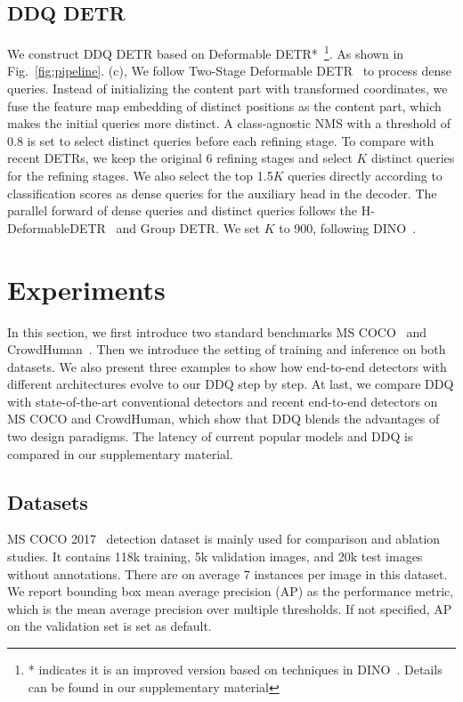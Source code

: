 \documentclass[10pt,twocolumn,letterpaper]{article}
\begin{document}
\subsection{DDQ DETR} We construct DDQ DETR based on Deformable DETR*~\footnote{* indicates it is an improved version based on techniques in DINO~\cite{zhang2022dino}. Details can be found in our supplementary material}. As shown in Fig.~\ref{fig:pipeline}. (c), We follow Two-Stage Deformable DETR~\cite{zhu2020deformable} to process dense queries. Instead of initializing the content part with transformed coordinates, we fuse the feature map embedding of distinct positions as the content part, which makes the initial queries more distinct. A class-agnostic NMS with a threshold of 0.8 is set to select distinct queries before each refining stage. To compare with recent DETRs, we keep the original 6 refining stages and select $K$ distinct queries for the refining stages. We also select the top 1.5$K$ queries directly according to classification scores as dense queries for the auxiliary head in the decoder. The parallel forward of dense queries and distinct queries follows the H-DeformableDETR~\cite{jia2022detrs} and Group DETR\cite{chen2022group}. We set $K$ to 900, following DINO~\cite{zhang2022dino}. \section{Experiments}
\label{sec:results}
In this section, we first introduce two standard benchmarks MS COCO~\cite{lin2014microsoft} and CrowdHuman~\cite{shao2018crowdhuman}. Then we introduce the setting of training and inference on both datasets. We also present three examples to show how  end-to-end detectors with different architectures evolve to our DDQ step by step. At last, we compare DDQ with state-of-the-art conventional detectors and recent end-to-end detectors on MS COCO and CrowdHuman, which show that DDQ blends the advantages of two design paradigms. The latency of current popular models and DDQ is compared in our supplementary material.

\subsection{Datasets}
MS COCO 2017~\cite{lin2014microsoft} detection dataset is mainly used for comparison and ablation studies. It contains 118k training, 5k validation images, and 20k test images without annotations. There are on average 7 instances per image in this dataset. We report bounding box mean average precision (AP) as the performance metric, which is the mean average precision over multiple thresholds. If not specified, AP on the validation set is set as default. 
\end{document}
